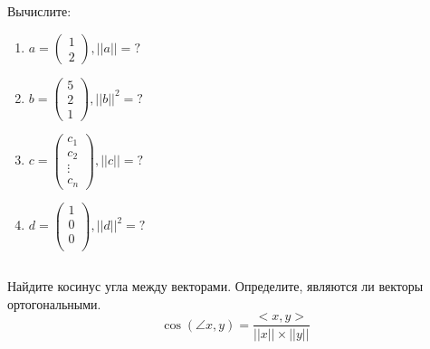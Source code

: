 \documentclass[11pt, a4paper]{extarticle}
\begin{document}
	\subsection{}
	Вычислите:
	\begin{multicols}{2}
		\begin{enumerate}[label=\alph*)]
			\item $a = \begin{pmatrix}
			1 \\
			2
			\end{pmatrix}, ||a|| = ?$
			\item $b = \begin{pmatrix}
			5 \\
			2 \\ 
			1
			\end{pmatrix}, ||b||^2 = ?$
			\item $c = \begin{pmatrix}
			c_1 \\
			c_2 \\
			\vdots \\
			c_n
			\end{pmatrix}, ||c|| = ?$
			\item $d = \begin{pmatrix}
			1 \\
			0 \\
			0 \\
			\end{pmatrix}, ||d||^2 = ?$
		\end{enumerate}
	\end{multicols}

	
	\subsection{}	
	Найдите косинус угла между векторами. Определите, являются ли векторы ортогональными. 
	\[
	\cos(\angle x, y) = \dfrac{<x, y>}{||x||\times||y||}
	\] 
	
\end{document}
